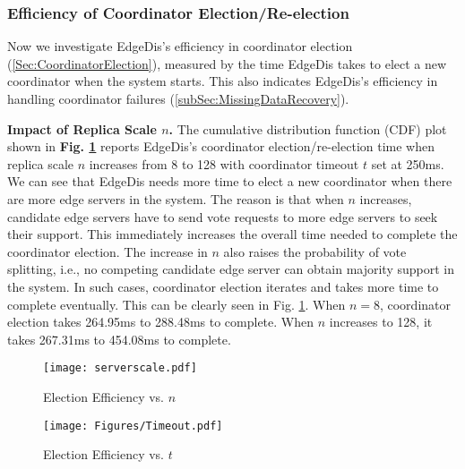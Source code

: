 \documentclass[10pt,journal,compsoc]{IEEEtran}
\begin{document}
%
\subsubsection{Efficiency of Coordinator Election/Re-election}
\label{subsubsec:parameterImpacts}

Now we investigate EdgeDis's efficiency in coordinator election (\cref{Sec:CoordinatorElection}), measured by the time EdgeDis takes to elect a new coordinator when the system starts. This also indicates EdgeDis's efficiency in handling coordinator failures (\cref{subSec:MissingDataRecovery}).


\smallskip
\textbf{Impact of Replica Scale $n$.} The cumulative distribution function (CDF) plot shown in \textbf{Fig. \ref{Fig:Election_ServerScale}} reports EdgeDis's coordinator election/re-election time when replica scale $n$ increases from 8 to 128 with coordinator timeout $t$ set at 250ms. We can see that EdgeDis needs more time to elect a new coordinator when there are more edge servers in the system. The reason is that when $n$ increases, candidate edge servers have to send vote requests to more edge servers to seek their support. This immediately increases the overall time needed to complete the coordinator election. The increase in $n$ also raises the probability of vote splitting, i.e., no competing candidate edge server can obtain majority support in the system. In such cases, coordinator election iterates and takes more time to complete eventually. This can be clearly seen in Fig. \ref{Fig:Election_ServerScale}. When $n=8$, coordinator election takes 264.95ms to 288.48ms to complete. When $n$ increases to 128, it takes 267.31ms to 454.08ms to complete.


\begin{figure}[tbp]
\centering
    \centering
    \texttt{[image: serverscale.pdf]}
    \vspace{-1em}
    \caption{Election Efficiency vs. $n$}
    \label{Fig:Election_ServerScale} 
\end{figure}

\begin{figure}[tbp]
    \centering 
    \texttt{[image: Figures/Timeout.pdf]} 
    \vspace{-1em}
    \caption{Election Efficiency vs. $t$}
    \label{Fig:Election_Timeout}  
\end{figure}
\end{document}
